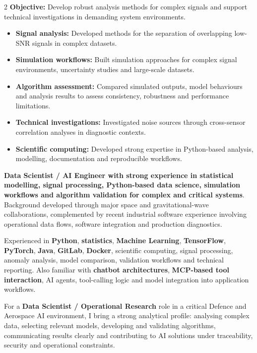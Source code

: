 \documentclass[8pt,a4paper,ragged2e,withhyper]{altacv}
\begin{document}
\begin{paracol}{2}
\textbf{Objective:} Develop robust analysis methods for complex signals and support technical investigations in demanding system environments.

\begin{itemize}
  \item \textbf{Signal analysis:} Developed methods for the separation of overlapping low-SNR signals in complex datasets.
  \item \textbf{Simulation workflows:} Built simulation approaches for complex signal environments, uncertainty studies and large-scale datasets.
  \item \textbf{Algorithm assessment:} Compared simulated outputs, model behaviours and analysis results to assess consistency, robustness and performance limitations.
  \item \textbf{Technical investigations:} Investigated noise sources through cross-sensor correlation analyses in diagnostic contexts.
  \item \textbf{Scientific computing:} Developed strong expertise in Python-based analysis, modelling, documentation and reproducible workflows.
\end{itemize}

\switchcolumn


\textbf{Data Scientist / AI Engineer with strong experience in statistical modelling, signal processing, Python-based data science, simulation workflows and algorithm validation for complex and critical systems}. Background developed through major space and gravitational-wave collaborations, complemented by recent industrial software experience involving operational data flows, software integration and production diagnostics.

Experienced in \textbf{Python}, \textbf{statistics}, \textbf{Machine Learning}, \textbf{TensorFlow}, \textbf{PyTorch}, \textbf{Java}, \textbf{GitLab}, \textbf{Docker}, scientific computing, signal processing, anomaly analysis, model comparison, validation workflows and technical reporting. Also familiar with \textbf{chatbot architectures}, \textbf{MCP-based tool interaction}, AI agents, tool-calling logic and model integration into application workflows.

For a \textbf{Data Scientist / Operational Research} role in a critical Defence and Aerospace AI environment, I bring a strong analytical profile: analysing complex data, selecting relevant models, developing and validating algorithms, communicating results clearly and contributing to AI solutions under traceability, security and operational constraints.


\end{paracol}
\end{document}
